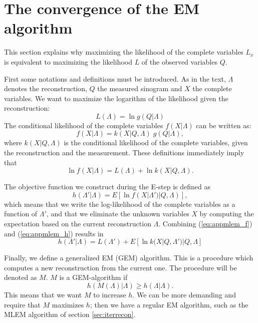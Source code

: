 \newpage
\section{The convergence of the EM algorithm} \label{app:em}
This section explains why maximizing the likelihood of the complete variables
$L_x$ is equivalent to maximizing the likelihood $L$ of the observed variables
$Q$.

First some notations and definitions must be introduced. As in the text,
$\Lambda$ denotes the reconstruction, $Q$ the measured sinogram and $X$ the
complete variables. We want to maximize the logarithm of the likelihood
given the reconstruction:
\begin{equation}
  L(\Lambda) = \ln g(Q | \Lambda)
\end{equation}
The conditional likelihood of the complete variables $f(X | \Lambda)$  can be
written as:
\begin{equation}
  f(X | \Lambda) = k(X | Q, \Lambda) \; g(Q | \Lambda),
\end{equation}
where $k(X | Q, \Lambda)$ is the conditional likelihood of the complete
variables, given the reconstruction and the measurement. These definitions
immediately  imply that
\begin{equation}
  \ln f(X | \Lambda) = L(\Lambda) + \ln k(X | Q, \Lambda). \label{eq:appmlem_f}
\end{equation}

The objective function we construct during the E-step is defined as
\begin{equation}
  h(\Lambda' | \Lambda) = E\left[\ln f(X | \Lambda') | Q, \Lambda)\right],
      \label{eq:appmlem_h}
\end{equation}
which means that we write the log-likelihood of the complete variables as a
function of $\Lambda'$, and that we eliminate the unknown variables $X$ by
computing the expectation based on the current reconstruction $\Lambda$.
Combining (\ref{eq:appmlem_f}) and (\ref{eq:appmlem_h}) results in
\begin{equation}
  h(\Lambda' | \Lambda) = L(\Lambda') + E\left[\ln k(X | Q, \Lambda') | Q,\Lambda\right]
   \label{eq:appmlem_h2}
\end{equation}

Finally, we define a generalized EM (GEM) algorithm. This is a procedure which
computes a new reconstruction from the current one. The procedure will be
denoted as $M$. $M$ is a GEM-algorithm if
\begin{equation}
  h(M(\Lambda) | \Lambda) \geq h(\Lambda | \Lambda).
\end{equation}
This means that we want $M$ to increase $h$. We can be more demanding and
require that $M$ maximizes $h$; then we have a regular EM algorithm, such as
the MLEM algorithm of section \ref{sec:iterrecon}.

